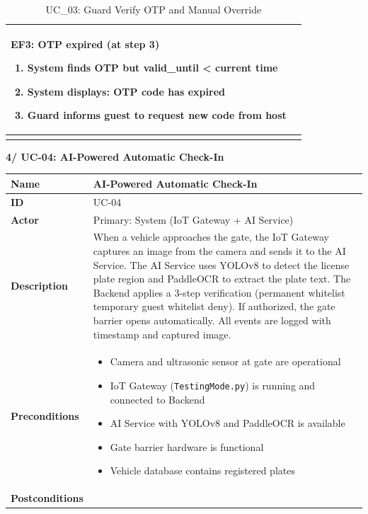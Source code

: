 \documentclass[a4paper]{article}
\newlength{\ucLeft}
\begin{document}
\begin{longtable}{|>{\bfseries}p{\ucLeft}|
                p{\dimexpr\textwidth-\ucLeft-4\tabcolsep-3\arrayrulewidth\relax}|}
\noindent \textbf{EF3: OTP expired (at step 3)}
\begin{enumerate}
    \item System finds OTP but valid\_until < current time
    \item System displays: OTP code has expired
    \item Guard informs guest to request new code from host
\end{enumerate}
\\ \hline
\caption{UC\_03: Guard Verify OTP and Manual Override}\label{tab:uc03}
\end{longtable}

\newpage
\noindent \textbf{4/ UC-04: AI-Powered Automatic Check-In}
\setlength{\tabcolsep}{6pt}
\renewcommand{\arraystretch}{1.2}
\setlength{\ucLeft}{30mm}

\begin{longtable}{|>{\bfseries}p{\ucLeft}|
                p{\dimexpr\textwidth-\ucLeft-4\tabcolsep-3\arrayrulewidth\relax}|}
\hline
Name & AI-Powered Automatic Check-In \\ \hline
ID & UC-04 \\ \hline
Actor & Primary: System (IoT Gateway + AI Service) \\ \hline
Description & When a vehicle approaches the gate, the IoT Gateway captures an image from the camera and sends it to the AI Service. The AI Service uses YOLOv8 to detect the license plate region and PaddleOCR to extract the plate text. The Backend applies a 3-step verification (permanent whitelist \textrightarrow{} temporary guest whitelist \textrightarrow{} deny). If authorized, the gate barrier opens automatically. All events are logged with timestamp and captured image. \\ \hline
Preconditions &
\begin{itemize}[leftmargin=*, nosep, topsep=0pt, partopsep=0pt, parsep=0pt]
    \item Camera and ultrasonic sensor at gate are operational
    \item IoT Gateway (\texttt{TestingMode.py}) is running and connected to Backend
    \item AI Service with YOLOv8 and PaddleOCR is available
    \item Gate barrier hardware is functional
    \item Vehicle database contains registered plates
\end{itemize}
\\ \hline
Postconditions &
\begin{itemize}[leftmargin=*, nosep, topsep=0pt, partopsep=0pt, parsep=0pt, after=\strut]

\end{itemize}
\end{longtable}
\end{document}
